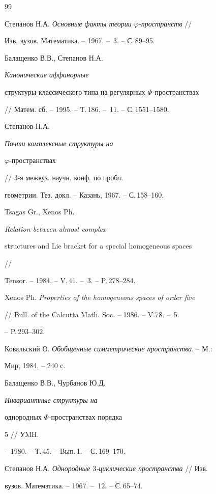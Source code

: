 \begin{thebibliography}{99}







Степанов Н.А. {\em Основные факты теории $\varphi$-пространств} //


Изв. вузов. Математика. -- 1967. -- \No\,3. -- С.\,89--95.




Балащенко В.В., Степанов Н.А. {\em Канонические аффинорные


структуры классического типа на регулярных $\Phi$-пространствах}


// Матем. сб. -- 1995. -- Т.\,186. -- \No\,11. -- С.\,1551--1580.




Степанов Н.А. {\em Почти комплексные структуры на


$\varphi$-пространствах} // 3-я межвуз. научн. конф. по пробл.


геометрии. Тез. докл. -- Казань, 1967. -- С.\,158--160.




Tsagas Gr., Xenos Ph. {\em Relation between almost complex


structures and Lie bracket for a special homogeneous spaces} //


Tensor. -- 1984. -- V.\,41. -- \No\,3. -- P.\,278--284.




Xenos Ph. {\em Properties of the homogeneous spaces of order five}


// Bull. of the Calcutta Math. Soc. -- 1986. -- V.78. -- \No\,5.


-- P.\,293--302.




Ковальский О. {\em Обобщенные симметрические пространства}. -- М.:


Мир, 1984. -- 240 с.




Балащенко В.В., Чурбанов Ю.Д. {\em Инвариантные структуры на


однородных $\Phi$-пространствах порядка} 5 // УMH.


-- 1980. -- Т.\,45. -- Bып.\,1. -- С.\,169--170.




Степанов Н.А. {\em Однородные $3$-циклические пространства} // Изв.


вузов. Математика. -- 1967. -- \No\,12. -- С.\,65--74.



\end{thebibliography}
